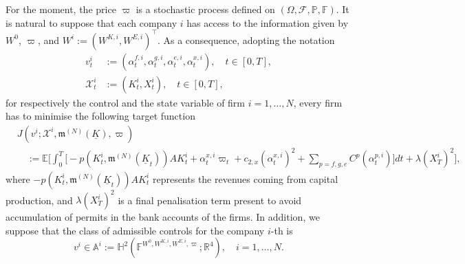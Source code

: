 \documentclass[10pt,a4paper]{amsart}
\numberwithin{equation}{section}
\newcommand{\w}{\varpi}
\newcommand{\E}{\mathbb{E}}
\newcommand{\F}{\mathbb{F}}
\newcommand{\R}{\mathbb{R}}
\newcommand{\ItF}{\mathcal{F}}
\newcommand{\prob}{\mathbb{P}}
\begin{document}
For the moment, the price $\w$ is a stochastic process defined on $(\Omega,\ItF,\prob,\F)$. It is natural to suppose that each company $i$ has access to the information given by $W^0$, $\w$, and $W^i:=(W^{K,i},W^{E,i})^\top$. As a consequence, adopting the notation
\begin{align*}
v^i_t 			&:= (\alpha^{f,i}_t,\alpha^{g,i}_t,\alpha^{e,i}_t,\alpha^{x,i}_t),\quad t\in[0,T],\\
\mathcal{X}^i_t &:= (K^i_t, X^i_t), \quad t\in[0,T],
\end{align*}
for respectively the control and the state variable of firm $i = 1,\dots,N$, every firm has to minimise the following target function
\begin{align}
\label{eqn: target companies N}
&J(v^i;\mathcal{X}^i,\mathfrak{m}^{(N)}(\underline{K}), \w) \\
\nonumber& \quad:= \E\Bigg[\int_0^T \bigg[-p(K^i_t,\mathfrak{m}^{(N)}(\underline{K}_t)) AK^i_t + \alpha^{x,i}_t \w_t + c_{2,x}(\alpha^{x,i}_t)^2 + \sum_{p = f,g,e}C^p(\alpha^{p,i}_t)\bigg] dt + \lambda (X^i_T)^2\Bigg],
\end{align}
where $-p(K^i_t,\mathfrak{m}^{(N)}(\underline{K}_t)) AK^i_t$ represents the revenues coming from capital production, and $\lambda(X^i_T)^2$ is a final penalisation term present to avoid accumulation of permits in the bank accounts of the firms. In addition, we suppose that the class of admissible controls for the company $i$-th is
\begin{equation*} 
v^i \in \mathbb{A}^i := \mathbb{H}^2( \F^{W^0, W^{K,i}, W^{E,i} ,\w};\R^4),\quad i = 1,\dots, N.
\end{equation*}
\end{document}
